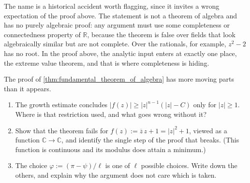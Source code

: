 \begin{ainote}
The name is a historical accident worth flagging, since it invites a wrong expectation of the
proof above. The statement is not a theorem of algebra and has no purely algebraic proof: any
argument must use some completeness or connectedness property of $\mathbb{R}$, because the
theorem is false over fields that look algebraically similar but are not complete. Over the
rationals, for example, $z^2-2$ has no root. In the proof above, the analytic input enters at
exactly one place, the extreme value theorem, and that is where completeness is hiding.
\end{ainote}

\begin{aiexercise}
\label{ex:ai_fta_hypotheses}
The proof of \cref{thm:fundamental_theorem_of_algebra} has more moving parts than it appears.
\begin{enumerate}[label=\textbf{(\alph*)}]
  \item The growth estimate concludes $\lvert f(z)\rvert \geq \lvert z\rvert^{n-1}(\lvert z\rvert
    - C)$ only for $\lvert z\rvert \geq 1$. Where is that restriction used, and what goes wrong
    without it?
  \item Show that the theorem fails for $f(z) := \overline{z}\,z + 1 = \lvert z\rvert^2+1$,
    viewed as a function $\mathbb{C}\to\mathbb{C}$, and identify the single step of the proof
    that breaks. (This function is continuous and its modulus does attain a minimum.)
  \item The choice $\varphi := (\pi-\psi)/\ell$ is one of $\ell$ possible choices. Write down the
    others, and explain why the argument does not care which is taken.
\end{enumerate}
\end{aiexercise}
